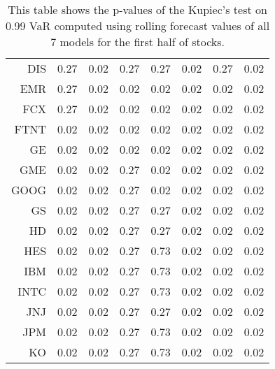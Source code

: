\begin{table}[ht]
\begin{tabular}{rrrrrrrr}
  DIS & 0.27 & 0.02 & 0.27 & 0.27 & 0.02 & 0.27 & 0.02 \\ 
  EMR & 0.27 & 0.02 & 0.02 & 0.02 & 0.02 & 0.02 & 0.02 \\ 
  FCX & 0.27 & 0.02 & 0.02 & 0.02 & 0.02 & 0.02 & 0.02 \\ 
  FTNT & 0.02 & 0.02 & 0.02 & 0.02 & 0.02 & 0.02 & 0.02 \\ 
  GE & 0.02 & 0.02 & 0.02 & 0.02 & 0.02 & 0.02 & 0.02 \\ 
  GME & 0.02 & 0.02 & 0.27 & 0.02 & 0.02 & 0.02 & 0.02 \\ 
  GOOG & 0.02 & 0.02 & 0.27 & 0.02 & 0.02 & 0.02 & 0.02 \\ 
  GS & 0.02 & 0.02 & 0.27 & 0.27 & 0.02 & 0.02 & 0.02 \\ 
  HD & 0.02 & 0.02 & 0.27 & 0.27 & 0.02 & 0.02 & 0.02 \\ 
  HES & 0.02 & 0.02 & 0.27 & 0.73 & 0.02 & 0.02 & 0.02 \\ 
  IBM & 0.02 & 0.02 & 0.27 & 0.73 & 0.02 & 0.02 & 0.02 \\ 
  INTC & 0.02 & 0.02 & 0.27 & 0.73 & 0.02 & 0.02 & 0.02 \\ 
  JNJ & 0.02 & 0.02 & 0.27 & 0.27 & 0.02 & 0.02 & 0.02 \\ 
  JPM & 0.02 & 0.02 & 0.27 & 0.73 & 0.02 & 0.02 & 0.02 \\ 
  KO & 0.02 & 0.02 & 0.27 & 0.73 & 0.02 & 0.02 & 0.02 \\ 
   \hline
\end{tabular}
\caption[Kupiec's test p-values, alpha =0.99 (1)]{This table shows the p-values of the Kupiec's test on 0.99 VaR computed using rolling forecast values of all 7 models for the first half of stocks.} 
\label{Table:Kupiec_test_rolling_0.99_1}
\end{table}
